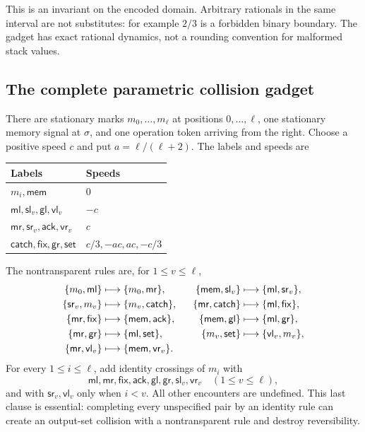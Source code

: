 \documentclass[11pt,letterpaper]{article}
\numberwithin{equation}{section}
\theoremstyle{definition}
\theoremstyle{remark}
\newcommand{\sig}{\sigma}\newcommand{\blank}{\mathsf b}
\newcommand{\ml}{\mathsf{ml}}\newcommand{\mr}{\mathsf{mr}}\newcommand{\mem}{\mathsf{mem}}
\newcommand{\lab}[1]{\mathsf{#1}}\newcommand{\diag}{\operatorname{diag}}
\begin{document}
This is an invariant on the encoded domain. Arbitrary rationals in the same interval are not substitutes: for example $2/3$ is a forbidden binary boundary. The gadget has exact rational dynamics, not a rounding convention for malformed stack values.

\subsection{The complete parametric collision gadget}
There are stationary marks $m_0,\ldots,m_\ell$ at positions $0,\ldots,\ell$, one stationary memory signal at $\sig$, and one operation token arriving from the right. Choose a positive speed $c$ and put $a=\ell/(\ell+2)$. The labels and speeds are
\begin{center}
\begin{tabular}{ll}
\toprule
Labels & Speeds\\
\midrule
$m_i,\mem$ & $0$\\
$\ml,\lab{sl}_v,\lab{gl},\lab{vl}_v$ & $-c$\\
$\mr,\lab{sr}_v,\lab{ack},\lab{vr}_v$ & $c$\\
$\lab{catch},\lab{fix},\lab{gr},\lab{set}$ & $c/3,-ac,ac,-c/3$\\
\bottomrule
\end{tabular}
\end{center}
The nontransparent rules are, for $1\le v\le\ell$,
\begin{alignat}{3}
 \set{m_0,\ml}&\longmapsto\set{m_0,\mr},&\quad
 \set{\mem,\lab{sl}_v}&\longmapsto\set{\ml,\lab{sr}_v},\label{smc:cs:eq:rules1}\\
 \set{\lab{sr}_v,m_v}&\longmapsto\set{m_v,\lab{catch}},&
 \set{\mr,\lab{catch}}&\longmapsto\set{\ml,\lab{fix}},\\
 \set{\mr,\lab{fix}}&\longmapsto\set{\mem,\lab{ack}},&
 \set{\mem,\lab{gl}}&\longmapsto\set{\ml,\lab{gr}},\\
 \set{\mr,\lab{gr}}&\longmapsto\set{\ml,\lab{set}},&
 \set{m_v,\lab{set}}&\longmapsto\set{\lab{vl}_v,m_v},\\
 \set{\mr,\lab{vl}_v}&\longmapsto\set{\mem,\lab{vr}_v}.&&\label{smc:cs:eq:rules5}
\end{alignat}
For every $1\le i\le\ell$, add identity crossings of $m_i$ with
\[
 \ml,\mr,\lab{fix},\lab{ack},\lab{gl},\lab{gr},
 \lab{sl}_v,\lab{vr}_v\quad(1\le v\le\ell),
\]
and with $\lab{sr}_v,\lab{vl}_v$ only when $i<v$. All other encounters are undefined. This last clause is essential: completing every unspecified pair by an identity rule can create an output-set collision with a nontransparent rule and destroy reversibility.
\end{document}

